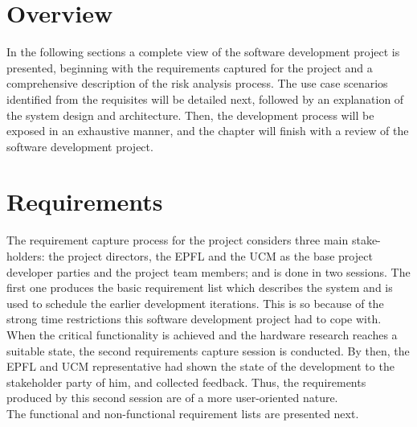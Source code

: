 	\section{Overview}
	\label{sec:sw-oview}
	In the following sections a complete view of the software development project is presented, beginning with the requirements captured for the project and a comprehensive description of the risk analysis process. The use case scenarios identified from the requisites will be detailed next, followed by an explanation of the system design and architecture. Then, the development process will be exposed in an exhaustive manner, and the chapter will finish with a review of the software development project.

	\section{Requirements}
	\label{sec:sw-reqs}
		The requirement capture process for the project considers three main stake-holders: the project directors, the EPFL and the UCM as the base project developer parties and the project team members; and is done in two sessions. The first one produces the basic requirement list which describes the system and is used to schedule the earlier development iterations. This is so because of the strong time restrictions this software development project had to cope with. 
		When the critical functionality is achieved and the hardware research reaches a suitable state, the second requirements capture session is conducted. By then, the EPFL and UCM representative had shown the state of the development to the stakeholder party of him, and collected feedback. Thus, the requirements produced by this second session are of a more user-oriented nature.\\

		
		The functional and non-functional requirement lists are presented next.

